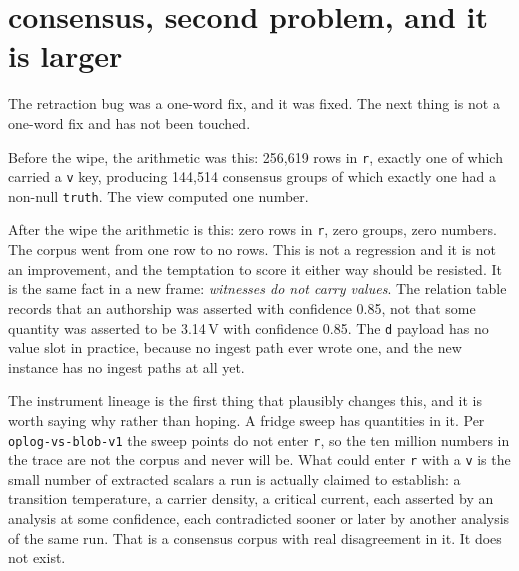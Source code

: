 \section{consensus, second problem, and it is larger}

The retraction bug was a one-word fix, and it was fixed. The next thing is not a one-word fix and has not been touched.

Before the wipe, the arithmetic was this: 256{,}619 rows in \texttt{r}, exactly one of which carried a \texttt{v} key, producing 144{,}514 consensus groups of which exactly one had a non-null \texttt{truth}. The view computed one number.

After the wipe the arithmetic is this: zero rows in \texttt{r}, zero groups, zero numbers. The corpus went from one row to no rows. This is not a regression and it is not an improvement, and the temptation to score it either way should be resisted. It is the same fact in a new frame: \emph{witnesses do not carry values}. The relation table records that an authorship was asserted with confidence 0.85, not that some quantity was asserted to be 3.14\,V with confidence 0.85. The \texttt{d} payload has no value slot in practice, because no ingest path ever wrote one, and the new instance has no ingest paths at all yet.

The instrument lineage is the first thing that plausibly changes this, and it is worth saying why rather than hoping. A fridge sweep has quantities in it. Per \texttt{oplog-vs-blob-v1} the sweep points do not enter \texttt{r}, so the ten million numbers in the trace are not the corpus and never will be. What could enter \texttt{r} with a \texttt{v} is the small number of extracted scalars a run is actually claimed to establish: a transition temperature, a carrier density, a critical current, each asserted by an analysis at some confidence, each contradicted sooner or later by another analysis of the same run. That is a consensus corpus with real disagreement in it. It does not exist.

